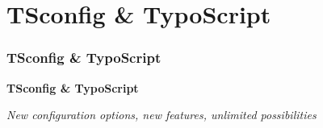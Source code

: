 %

\section{TSconfig \& TypoScript}
\begin{frame}[fragile]
	\frametitle{TSconfig \& TypoScript}

	\begin{center}\huge{\color{typo3darkgrey}\textbf{TSconfig \& TypoScript}}\end{center}
	\begin{center}\large{\textit{New configuration options, new features, unlimited possibilities}}\end{center}

\end{frame}

